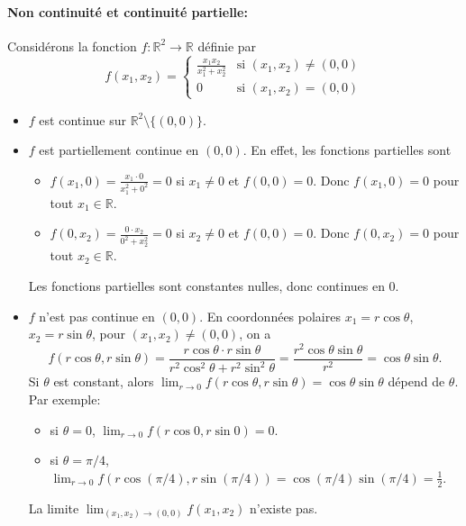 \documentclass{article}
\begin{document}
\paragraph{\textbf{Non continuité et continuité partielle:}}
Considérons la fonction $f: \mathbb{R}^2 \rightarrow \mathbb{R}$ définie par
\[
f(x_1, x_2) = \begin{cases}
\frac{x_1 x_2}{x_1^2 + x_2^2} & \text{si } (x_1, x_2) \neq (0, 0) \\
0 & \text{si } (x_1, x_2) = (0, 0)
\end{cases}
\]
\begin{itemize}
    \item $f$ est continue sur $\mathbb{R}^2 \setminus \{(0, 0)\}$.
    \item $f$ est partiellement continue en $(0, 0)$. En effet, les fonctions partielles sont
    \begin{itemize}
        \item $f(x_1, 0) = \frac{x_1 \cdot 0}{x_1^2 + 0^2} = 0$ si $x_1 \neq 0$ et $f(0, 0) = 0$. Donc $f(x_1, 0) = 0$ pour tout $x_1 \in \mathbb{R}$.
        \item $f(0, x_2) = \frac{0 \cdot x_2}{0^2 + x_2^2} = 0$ si $x_2 \neq 0$ et $f(0, 0) = 0$. Donc $f(0, x_2) = 0$ pour tout $x_2 \in \mathbb{R}$.
    \end{itemize}
    Les fonctions partielles sont constantes nulles, donc continues en $0$.
    \item $f$ n'est pas continue en $(0, 0)$.
    En coordonnées polaires $x_1 = r \cos \theta$, $x_2 = r \sin \theta$, pour $(x_1, x_2) \neq (0, 0)$, on a
    \[
    f(r \cos \theta, r \sin \theta) = \frac{r \cos \theta \cdot r \sin \theta}{r^2 \cos^2 \theta + r^2 \sin^2 \theta} = \frac{r^2 \cos \theta \sin \theta}{r^2} = \cos \theta \sin \theta.
    \]
    Si $\theta$ est constant, alors $\lim_{r \rightarrow 0} f(r \cos \theta, r \sin \theta) = \cos \theta \sin \theta$ dépend de $\theta$. Par exemple:
    \begin{itemize}
        \item si $\theta = 0$, $\lim_{r \rightarrow 0} f(r \cos 0, r \sin 0) = 0$.
        \item si $\theta = \pi/4$, $\lim_{r \rightarrow 0} f(r \cos (\pi/4), r \sin (\pi/4)) = \cos (\pi/4) \sin (\pi/4) = \frac{1}{2}$.
    \end{itemize}
    La limite $\lim_{(x_1, x_2) \rightarrow (0, 0)} f(x_1, x_2)$ n'existe pas.
\end{itemize}
\end{document}
